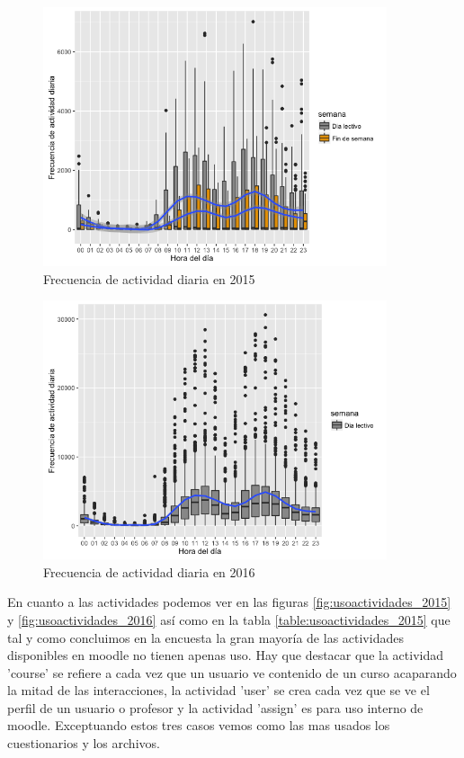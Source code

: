 \begin{figure}[H]
\centering
\includegraphics[width=0.9\textwidth]{../r/frecuenciaactividaddiaria_2015}
\caption{Frecuencia de actividad diaria en 2015}
\label{fig:frecuenciaactividaddiaria_2015}
\end{figure}

\begin{figure}[H]
\centering
\includegraphics[width=0.9\textwidth]{../r/frecuenciaactividaddiaria_2016}
\caption{Frecuencia de actividad diaria en 2016}
\label{fig:frecuenciaactividaddiaria_2016}
\end{figure}


En cuanto a las actividades podemos ver en las figuras \ref{fig:usoactividades_2015} y \ref{fig:usoactividades_2016} así como en la tabla \ref{table:usoactividades_2015} que tal y como concluimos en la encuesta la gran mayoría de las actividades disponibles en moodle no tienen apenas uso. Hay que destacar que la actividad 'course' se refiere a cada vez que un usuario ve contenido de un curso acaparando la mitad de las interacciones, la actividad 'user' se crea cada vez que se ve el perfil de un usuario o profesor y la actividad 'assign' es para uso interno de moodle. Exceptuando estos tres casos vemos como las mas usados los cuestionarios y los archivos.

